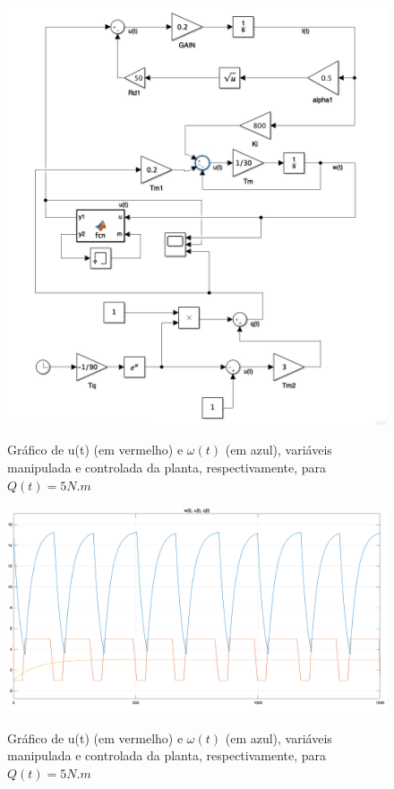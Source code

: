 \documentclass[11pt]{article}
\begin{document}
\begin{figure}[H]
	\centering
	{\includegraphics[width=\textwidth]
		{assets/q4_c_control_schema.jpg}}
	\caption{Gráfico de u(t) (em vermelho) e $\omega(t)$ (em azul), variáveis manipulada e controlada da planta, respectivamente, para $Q(t) = 5 N.m$}
\end{figure}

\begin{figure}[H]
	\centering
	{\includegraphics[width=\textwidth]
		{assets/q4_c_plot.png}}
	\caption{Gráfico de u(t) (em vermelho) e $\omega(t)$ (em azul), variáveis manipulada e controlada da planta, respectivamente, para $Q(t) = 5 N.m$}
\end{figure}
\end{document}
